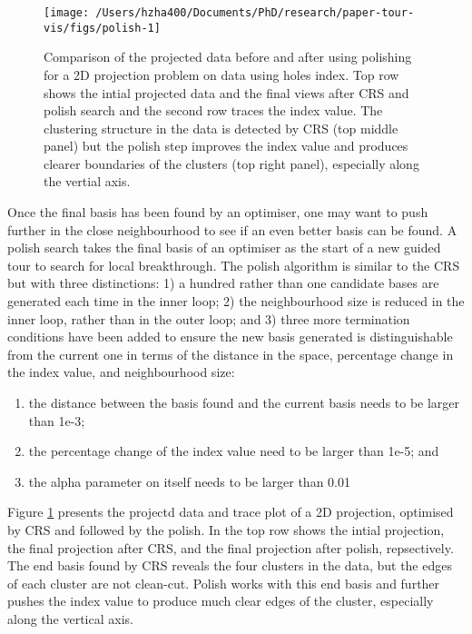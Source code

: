 \begin{Schunk}
\begin{figure}

{\centering \texttt{[image: /Users/hzha400/Documents/PhD/research/paper-tour-vis/figs/polish-1]} 

}

\caption[Comparison of the projected data before and after using polishing for a 2D projection problem on  data using holes index]{Comparison of the projected data before and after using polishing for a 2D projection problem on  data using holes index. Top row shows the intial projected data and the final views after CRS and polish search and the second row traces the index value. The clustering structure in the data is detected by CRS (top middle panel) but the polish step improves the index value and produces clearer boundaries of the clusters (top right panel), especially along the vertial axis.}\label{fig:polish}
\end{figure}
\end{Schunk}

Once the final basis has been found by an optimiser, one may want to
push further in the close neighbourhood to see if an even better basis
can be found. A polish search takes the final basis of an optimiser as
the start of a new guided tour to search for local breakthrough. The
polish algorithm is similar to the CRS but with three distinctions: 1) a
hundred rather than one candidate bases are generated each time in the
inner loop; 2) the neighbourhood size is reduced in the inner loop,
rather than in the outer loop; and 3) three more termination conditions
have been added to ensure the new basis generated is distinguishable
from the current one in terms of the distance in the space, percentage
change in the index value, and neighbourhood size:

\begin{enumerate}
\def\labelenumi{\arabic{enumi})}
\tightlist
\item
  the distance between the basis found and the current basis needs to be
  larger than 1e-3;
\item
  the percentage change of the index value need to be larger than 1e-5;
  and
\item
  the alpha parameter on itself needs to be larger than 0.01
\end{enumerate}

Figure \ref{fig:polish} presents the projectd data and trace plot of a
2D projection, optimised by CRS and followed by the polish. In the top
row shows the intial projection, the final projection after CRS, and the
final projection after polish, repsectively. The end basis found by CRS
reveals the four clusters in the data, but the edges of each cluster are
not clean-cut. Polish works with this end basis and further pushes the
index value to produce much clear edges of the cluster, especially along
the vertical axis.

